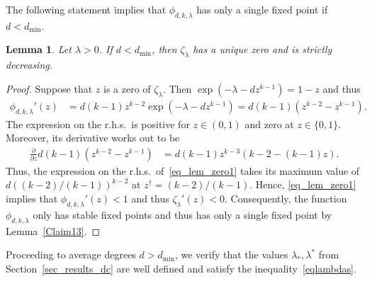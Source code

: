 \documentclass[10pt,reqno]{amsart}
\numberwithin{equation}{section}
\newcommand\dmin{d_{\mathrm{min}}}
\newcommand\dd{\partial}
\newcommand\Lem{Lemma}
\newcommand\Sec{Section}
\newtheorem{lemma}[definition]{Lemma}
\newcommand{\ph}{\phi_{d,k,\lambda}}
\newcommand{\zt}{\zeta_\lambda}
\begin{document}
The following statement implies that $\ph$ has only a single fixed point if $d<\dmin$.

\begin{lemma}\label{lem_belowdmin}
	Let $\lambda>0$.
	If $d<\dmin$, then $\zt$ has a unique zero and is strictly decreasing.
\end{lemma}
\begin{proof}
	Suppose that $z$ is a zero of $\zt$.
	Then $\exp(-\lambda-dz^{k-1})=1-z$ and thus
	\begin{align}\label{eq_lem_zero1}
		\ph'(z)&=d(k-1)z^{k-2}\exp(-\lambda-dz^{k-1})=d(k-1)(z^{k-2}-z^{k-1}).
	\end{align}
	The expression on the r.h.s.\ is positive for $z\in(0,1)$ and zero at $z\in\{0,1\}$.
	Moreover, its derivative works out to be
	\begin{align*}
		\frac{\dd}{\dd z}d(k-1)(z^{k-2}-z^{k-1})&=d(k-1)z^{k-3}(k-2-(k-1)z).
	\end{align*}
	Thus, the expression on the r.h.s.\ of~\eqref{eq_lem_zero1} takes its maximum value of	$d((k-2)/(k-1))^{k-2}$ at $z^\dagger=(k-2)/(k-1)$.
	Hence, \eqref{eq_lem_zero1} implies that $\ph'(z)<1$ and thus $\zt'(z)<0$.
	Consequently, the function $\ph$ only has stable fixed points and thus has only a single fixed point by \Lem~\ref{Claim13}.
\end{proof}

Proceeding to average degrees $d>\dmin$, we verify that the values $\lambda_*,\lambda^*$ from \Sec~\ref{sec_results_dc} are well defined and satisfy the inequality~\eqref{eqlambdas}.
\end{document}
